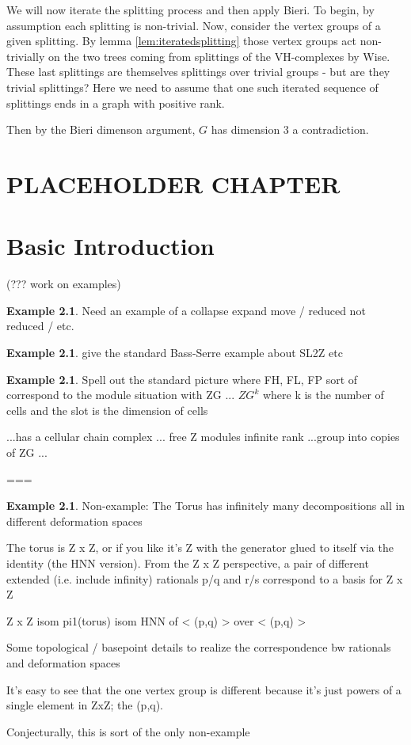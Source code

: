 \documentclass[12pt,parskip=full]{report}
\theoremstyle{plain}
\theoremstyle{definition}
\newtheorem{exa}[thm]{Example}
\begin{document}
We will now iterate the splitting process and then apply Bieri. To begin, by assumption each splitting is non-trivial. Now, consider the vertex groups of a given splitting. By lemma \ref{lem:iteratedsplitting} those vertex groups act non-trivially on the two trees coming from splittings of the VH-complexes by Wise. These last splittings are themselves splittings over trivial groups - but are they trivial splittings? Here we need to assume that one such iterated sequence of splittings ends in a graph with positive rank.
        
Then by the Bieri dimenson argument, \(G\) has dimension 3 a contradiction.


\chapter{PLACEHOLDER CHAPTER}

\chapter{Basic Introduction}
\label{sect:intro}

(??? work on examples)
\begin{exa}
Need an example of a collapse expand move / reduced not reduced / etc.
\end{exa}

\begin{exa}
give the standard Bass-Serre example about SL2Z etc
\end{exa}

\begin{exa}
Spell out the standard picture where FH, FL, FP sort of correspond to the module situation with ZG ... \(ZG^k\) where k is the number of cells and the slot is the dimension of cells

...has a cellular chain complex ... free Z modules infinite rank
...group into copies of ZG ...



===






\end{exa}

\begin{exa}
Non-example: The Torus has infinitely many decompositions all in different deformation spaces

The torus is Z x Z, or if you like it's Z with the generator glued to itself via the identity (the HNN version). 
From the Z x Z perspective, a pair of different extended (i.e. include infinity) rationals p/q and r/s correspond to a basis for Z x Z

Z x Z isom pi1(torus) isom HNN of < (p,q) > over < (p,q) >

Some topological / basepoint details to realize the correspondence bw rationals and deformation spaces

It's easy to see that the one vertex group is different because it's just powers of a single element in ZxZ; the (p,q).

Conjecturally, this is sort of the only non-example


\end{exa}
\end{document}
